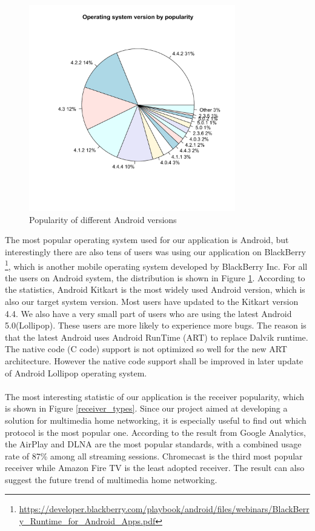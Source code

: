 \begin{figure}[hb]
\centering \includegraphics[height=9cm]{charts/os_version_popularity}
\caption{Popularity of different Android versions \label{os_versions}}
\end{figure}
The most popular operating system used for our application is Android, but interestingly there are also tens of users was using our application on BlackBerry \footnote{\url{https://developer.blackberry.com/playbook/android/files/webinars/BlackBerry_Runtime_for_Android_Apps.pdf}}, which is another mobile operating system developed by BlackBerry Inc.  For all the users on Android system, the distribution is shown in Figure \ref{os_versions}. According to the statistics, Android Kitkart is the most widely used Android version, which is also our target system version. Most users have updated to the Kitkart version 4.4. We also have a very small part of users who are using the latest Android 5.0(Lollipop). These users are more likely to experience more bugs. The reason is that the latest Android uses Android RunTime (ART) to replace Dalvik runtime\cite{dalvik_arch}. The native code (C code) support is not optimized so well for the new ART architecture. However the native code support shall be improved in later update of Android Lollipop operating system.\\
\\
The most interesting statistic of our application is the receiver popularity, which is shown in Figure \ref{receiver_types}. Since our project aimed at developing a solution for multimedia home networking, it is especially useful to find out which protocol is the most popular one. According to the result from Google Analytics, the AirPlay and DLNA are the most popular standards, with a combined   usage rate of 87\% among all streaming sessions. Chromecast is the third most popular receiver while Amazon Fire TV is the least adopted receiver. The result can also suggest the future trend of multimedia home networking.
